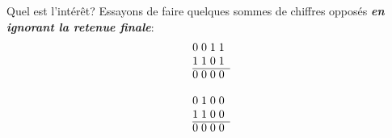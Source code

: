 \documentclass[12pt]{article}
\begin{document}
	Quel est l'intérêt? Essayons de faire quelques sommes de chiffres opposés \textbf{\textit{en ignorant la retenue finale}}:
	\[
	\begin{array}{@{}r *{4}{@{\;}c}}
		& 0 & 0 & 1 & 1 \\
		& 1 & 1 & 0 & 1  \\
		\cline{2-5}
		& 0 & 0 & 0 & 0 \\
	\end{array}
	\]
	\par
	\[
	\begin{array}{@{}r *{4}{@{\;}c}}
		& 0 & 1 & 0 & 0 \\
		& 1 & 1 & 0 & 0  \\
		\cline{2-5}
		& 0 & 0 & 0 & 0 \\
	\end{array}
	\]
	
\end{document}
